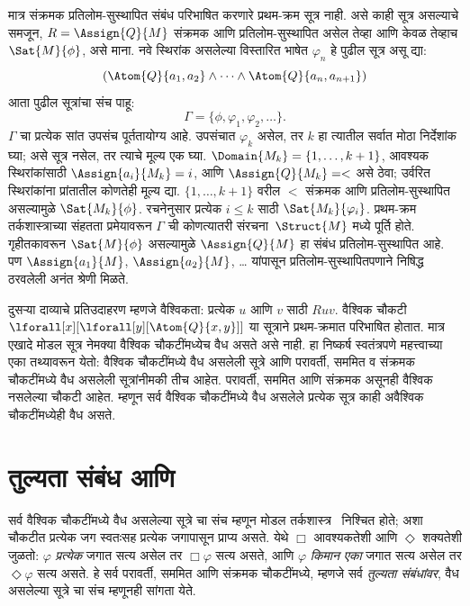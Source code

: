 मात्र संक्रमक प्रतिलोम-सुस्थापित संबंध परिभाषित करणारे
प्रथम-क्रम सूत्र नाही. असे काही सूत्र असल्याचे
समजून, $R =
\Assign{Q}{M}$ संक्रमक आणि प्रतिलोम-सुस्थापित असेल
तेव्हा आणि केवळ तेव्हाच $\Sat{M}{\phi}$, असे माना.
नवे स्थिरांक असलेल्या विस्तारित भाषेत $\varphi_n$ हे
पुढील सूत्र असू द्या:
\[(\Atom{Q}{a_1,a_2} \land \dots \land
    \Atom{Q}{a_{n},a_{n+1}})
\]
आता पुढील सूत्रांचा संच पाहू:
\[\Gamma = \{\phi, \varphi_1, \varphi_2, \dots\}.
\]
$\Gamma$ चा प्रत्येक सांत उपसंच पूर्ततायोग्य आहे.
उपसंचात $\varphi_k$ असेल, तर $k$ हा त्यातील सर्वात मोठा
निर्देशांक घ्या; असे सूत्र नसेल, तर त्याचे मूल्य एक
घ्या. $\Domain{M_k} = \{1, \dots, k+1\}$,
आवश्यक स्थिरांकांसाठी $\Assign{a_i}{M_k} = i$,
आणि $\Assign{Q}{M_k} = <$ असे ठेवा; उर्वरित
स्थिरांकांना प्रांतातील कोणतेही मूल्य द्या.
$\{1,
\dots, k+1\}$ वरील $<$ संक्रमक आणि प्रतिलोम-सुस्थापित
असल्यामुळे $\Sat{M_k}{\phi}$. रचनेनुसार प्रत्येक
$i \le k$ साठी $\Sat{M_k}{\varphi_i}$.
प्रथम-क्रम तर्कशास्त्राच्या संहतता प्रमेयावरून
$\Gamma$ ची कोणत्यातरी संरचना~$\Struct{M}$
मध्ये पूर्ति होते. गृहीतकावरून $\Sat{M}{\phi}$
असल्यामुळे $\Assign{Q}{M}$ हा संबंध प्रतिलोम-सुस्थापित
आहे. पण $\Assign{a_1}{M}$, $\Assign{a_2}{M}$,
\dots{} यांपासून प्रतिलोम-सुस्थापितपणाने निषिद्ध
ठरवलेली अनंत श्रेणी मिळते.

दुसऱ्या दाव्याचे प्रतिउदाहरण म्हणजे वैश्विकता:
प्रत्येक $u$ आणि $v$ साठी $Ruv$. वैश्विक चौकटी
$\lforall[x][\lforall[y][\Atom{Q}{x,y}]]$ या
सूत्राने प्रथम-क्रमात परिभाषित होतात. मात्र एखादे
मोडल सूत्र नेमक्या वैश्विक चौकटींमध्येच वैध
असते असे नाही. हा निष्कर्ष स्वतंत्रपणे महत्त्वाच्या
एका तथ्यावरून येतो: वैश्विक चौकटींमध्ये वैध
असलेली सूत्रे आणि परावर्ती, सममित व संक्रमक
चौकटींमध्ये वैध असलेली सूत्रांनीमकी तीच आहेत.
परावर्ती, सममित आणि संक्रमक असूनही वैश्विक
नसलेल्या चौकटी आहेत. म्हणून सर्व वैश्विक चौकटींमध्ये
वैध असलेले प्रत्येक सूत्र काही अवैश्विक
चौकटींमध्येही वैध असते.












\section{तुल्यता संबंध आणि }\label{nml:frd:es5:sec}

सर्व वैश्विक चौकटींमध्ये वैध असलेल्या सूत्रे
चा संच म्हणून मोडल तर्कशास्त्र~ निश्चित होते;
अशा चौकटीत प्रत्येक जग स्वतःसह प्रत्येक जगापासून
प्राप्य असते. येथे $\Box$ आवश्यकतेशी आणि
$\Diamond$ शक्यतेशी जुळतो: $\varphi$ \emph{प्रत्येक}
जगात सत्य असेल तर $\Box \varphi$ सत्य असते, आणि
$\varphi$ \emph{किमान एका} जगात सत्य असेल तर
$\Diamond \varphi$ सत्य असते.  हे सर्व परावर्ती,
सममित आणि संक्रमक चौकटींमध्ये, म्हणजे सर्व
\emph{तुल्यता संबंधांवर}, वैध असलेल्या सूत्रे
चा संच म्हणूनही सांगता येते.

